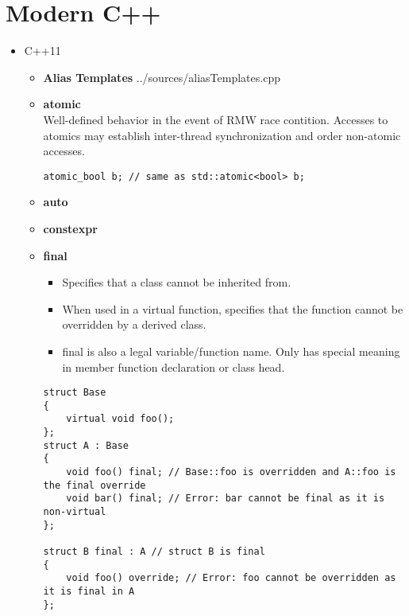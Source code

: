 \documentclass{article}
\begin{document}
\section{Modern C++}
\begin{itemize}
	\item C++11
	      \begin{itemize}
		      \item \textbf{Alias Templates}
		             {../sources/aliasTemplates.cpp}
		      \item \textbf{atomic} \\
		            Well-defined behavior in the event of RMW race contition. Accesses to atomics may establish inter-thread synchronization and order non-atomic accesses.
		            \begin{lstlisting}[style=cpp]
atomic_bool b; // same as std::atomic<bool> b;
         \end{lstlisting}
		      \item \textbf{auto}
		      \item \textbf{constexpr}
		      \item \textbf{final}
		            \begin{itemize}
			            \item Specifies that a class cannot be inherited from.
			            \item When used in a virtual function, specifies that the function cannot be overridden by a derived class.
			            \item final is also a legal variable/function name. Only has special meaning in member function declaration or class head.
		            \end{itemize}
		            \begin{lstlisting}[style=cpp]
struct Base
{
    virtual void foo();
};
struct A : Base
{
    void foo() final; // Base::foo is overridden and A::foo is the final override
    void bar() final; // Error: bar cannot be final as it is non-virtual
};
 
struct B final : A // struct B is final
{
    void foo() override; // Error: foo cannot be overridden as it is final in A
};
 

\end{lstlisting}
\end{itemize}
\end{itemize}
\end{document}

